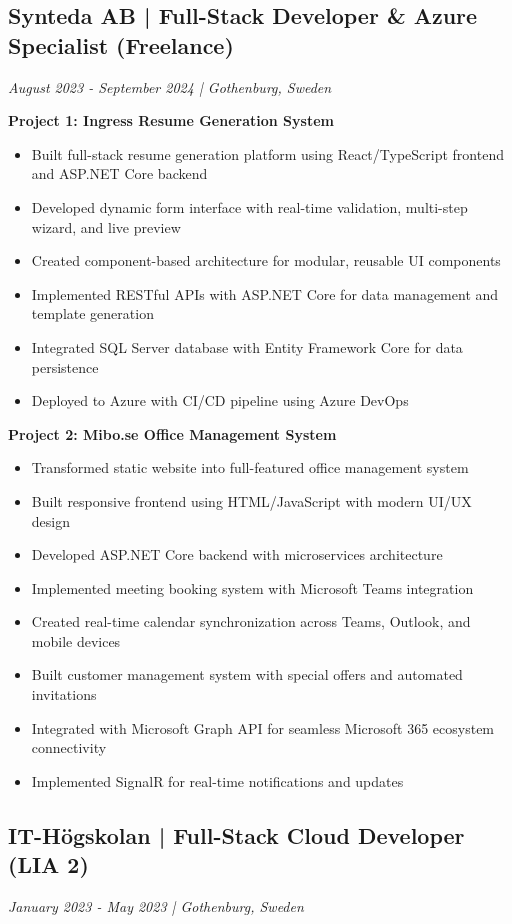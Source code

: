 \documentclass[11pt,a4paper]{article}
\begin{document}
\subsection*{Synteda AB | Full-Stack Developer \& Azure Specialist (Freelance)}
\textit{August 2023 - September 2024 | Gothenburg, Sweden}

\textbf{Project 1: Ingress Resume Generation System}
\begin{itemize}[leftmargin=*, itemsep=2pt]
\item Built full-stack resume generation platform using React/TypeScript frontend and ASP.NET Core backend
\item Developed dynamic form interface with real-time validation, multi-step wizard, and live preview
\item Created component-based architecture for modular, reusable UI components
\item Implemented RESTful APIs with ASP.NET Core for data management and template generation
\item Integrated SQL Server database with Entity Framework Core for data persistence
\item Deployed to Azure with CI/CD pipeline using Azure DevOps
\end{itemize}

\textbf{Project 2: Mibo.se Office Management System}
\begin{itemize}[leftmargin=*, itemsep=2pt]
\item Transformed static website into full-featured office management system
\item Built responsive frontend using HTML/JavaScript with modern UI/UX design
\item Developed ASP.NET Core backend with microservices architecture
\item Implemented meeting booking system with Microsoft Teams integration
\item Created real-time calendar synchronization across Teams, Outlook, and mobile devices
\item Built customer management system with special offers and automated invitations
\item Integrated with Microsoft Graph API for seamless Microsoft 365 ecosystem connectivity
\item Implemented SignalR for real-time notifications and updates
\end{itemize}

\subsection*{IT-Högskolan | Full-Stack Cloud Developer (LIA 2)}
\textit{January 2023 - May 2023 | Gothenburg, Sweden}
\end{document}
